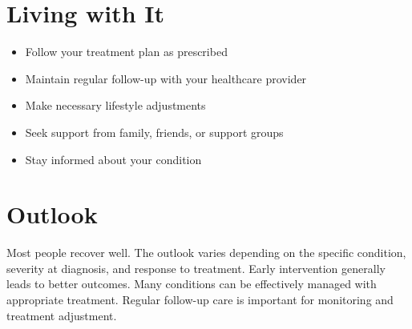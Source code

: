 \section{Living with It}
\begin{itemize}[noitemsep]
  \item Follow your treatment plan as prescribed
  \item Maintain regular follow-up with your healthcare provider
  \item Make necessary lifestyle adjustments
  \item Seek support from family, friends, or support groups
  \item Stay informed about your condition
\end{itemize}
\section{Outlook}
Most people recover well. The outlook varies depending on the specific condition, severity at diagnosis, and response to treatment. Early intervention generally leads to better outcomes. Many conditions can be effectively managed with appropriate treatment. Regular follow-up care is important for monitoring and treatment adjustment.
